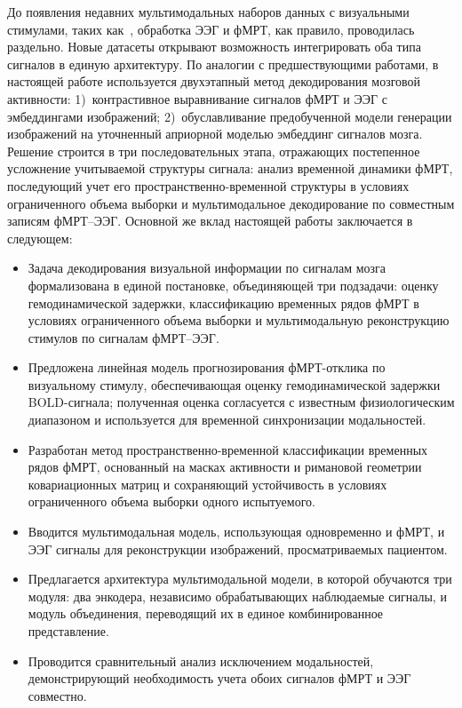 До появления недавних мультимодальных наборов данных с визуальными стимулами, таких как~\cite{Telesford2023}, обработка ЭЭГ и фМРТ, как правило, проводилась раздельно. Новые датасеты открывают возможность интегрировать оба типа сигналов в единую архитектуру. По аналогии с предшествующими работами, в настоящей работе используется двухэтапный метод декодирования мозговой активности: 1)~контрастивное выравнивание сигналов фМРТ и ЭЭГ с эмбеддингами изображений; 2)~обуславливание предобученной модели генерации изображений на уточненный априорной моделью эмбеддинг сигналов мозга. Решение строится в три последовательных этапа, отражающих постепенное усложнение учитываемой структуры сигнала: анализ временной динамики фМРТ, последующий учет его пространственно-временной структуры в условиях ограниченного объема выборки и мультимодальное декодирование по совместным записям фМРТ--ЭЭГ. Основной же вклад настоящей работы заключается в следующем:
\begin{itemize}
    \item Задача декодирования визуальной информации по сигналам мозга формализована в единой постановке, объединяющей три подзадачи: оценку гемодинамической задержки, классификацию временных рядов фМРТ в условиях ограниченного объема выборки и мультимодальную реконструкцию стимулов по сигналам фМРТ--ЭЭГ.
    \item Предложена линейная модель прогнозирования фМРТ-отклика по визуальному стимулу, обеспечивающая оценку гемодинамической задержки BOLD-сигнала; полученная оценка согласуется с известным физиологическим диапазоном и используется для временной синхронизации модальностей.
    \item Разработан метод пространственно-временной классификации временных рядов фМРТ, основанный на масках активности и римановой геометрии ковариационных матриц и сохраняющий устойчивость в условиях ограниченного объема выборки одного испытуемого.
    \item Вводится мультимодальная модель, использующая одновременно и фМРТ, и ЭЭГ сигналы для реконструкции изображений, просматриваемых пациентом.
    \item Предлагается архитектура мультимодальной модели, в которой обучаются три модуля: два энкодера, независимо обрабатывающих наблюдаемые сигналы, и модуль объединения, переводящий их в единое комбинированное представление.
    \item Проводится сравнительный анализ исключением модальностей, демонстрирующий необходимость учета обоих сигналов фМРТ и ЭЭГ совместно.
\end{itemize}

